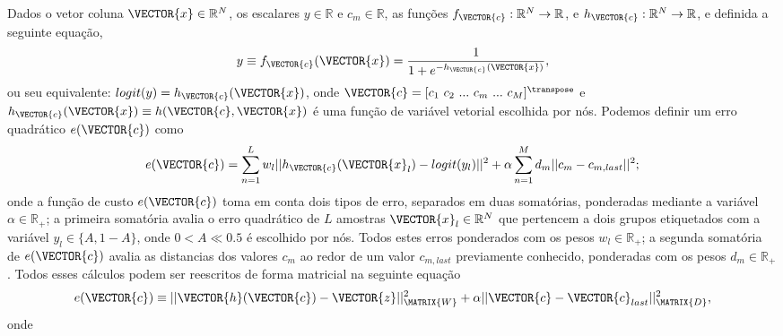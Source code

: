 
\begin{myproofT}\label{proof:theo:reglogrnr1nolinear}
Dados
o vetor coluna $\VECTOR{x} \in \mathbb{R}^{N}$, os escalares $y \in \mathbb{R}$ e $c_m \in \mathbb{R}$,
as funções $f_{\VECTOR{c}}:\mathbb{R}^{N} \rightarrow \mathbb{R}$, 
e $h_{\VECTOR{c}}:\mathbb{R}^{N} \rightarrow \mathbb{R}$,  e 
definida a seguinte equação,
\begin{equation}\label{eq:proof:theo:reglogrnr1nolinear:1}
y\equiv f_{\VECTOR{c}}(\VECTOR{x})= \frac{1}{1+e^{-h_{\VECTOR{c}}(\VECTOR{x}) }},
\end{equation}
ou seu equivalente: $logit(y)=h_{\VECTOR{c}}(\VECTOR{x})$,
onde $\VECTOR{c}=[c_1~ c_2~ ...~ c_m~ ...~ c_{M}]^{\transpose}$ e
$h_{\VECTOR{c}}(\VECTOR{x})\equiv h(\VECTOR{c},\VECTOR{x})$ é uma função de variável vetorial escolhida por nós.
Podemos definir um erro quadrático $e(\VECTOR{c})$ como
\begin{equation}\label{eq:proof:theo:reglogrnr1nolinear:2}
e(\VECTOR{c}) =  
\sum_{n=1}^{L} w_l||h_{\VECTOR{c}}(\VECTOR{x}_l)-logit(y_l)||^2
+\alpha \sum_{n=1}^{M} d_m||c_m-c_{m,last}||^2;
\end{equation}
onde a função de custo $e(\VECTOR{c})$ toma em conta dois tipos de erro, separados em duas somatórias,
ponderadas mediante a variável $\alpha \in \mathbb{R}_+$;
a primeira somatória avalia o erro quadrático de $L$ amostras $\VECTOR{x}_l \in \mathbb{R}^{N}$ que pertencem a 
dois grupos etiquetados com a variável $y_l\in \{A,1-A\}$, 
onde $0<A\ll 0.5$ é escolhido por nós.
Todos estes erros ponderados com os pesos $w_l \in \mathbb{R}_+$;
a segunda somatória de $e(\VECTOR{c})$ 
avalia as distancias dos valores $c_m$ ao redor de um valor $c_{m,last}$
previamente conhecido,
ponderadas com os pesos $d_m \in \mathbb{R}_+$.
Todos esses cálculos podem ser reescritos de forma matricial
na seguinte equação
\begin{equation}\label{eq:proof:theo:reglogrnr1nolinear:3}
e(\VECTOR{c}) \equiv ||\VECTOR{h}(\VECTOR{c})-\VECTOR{z}||_{\MATRIX{W}}^2
+ \alpha ||\VECTOR{c}-\VECTOR{c}_{last}||_{\MATRIX{D}}^2 ,
\end{equation}
onde
\begin{equation}\label{eq:proof:reglogrnr1nolinear:4}

\end{equation}
\end{myproofT}
